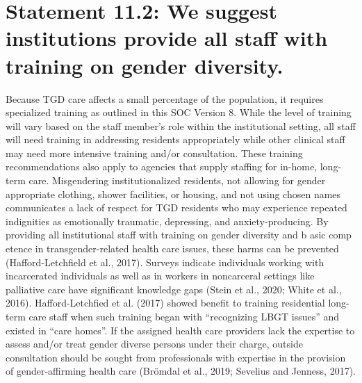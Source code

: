 \documentclass[
]{book}
\begin{document}
\hypertarget{statement-11.2-we-suggest-institutions-provide-all-staff-with-training-on-gender-diversity.}{%
\section*{Statement 11.2: We suggest institutions provide all staff with training on gender diversity.}\label{statement-11.2-we-suggest-institutions-provide-all-staff-with-training-on-gender-diversity.}}

Because TGD care affects a small percentage
of the population, it requires specialized training
as outlined in this SOC Version 8. While the
level of training will vary based on the staff
member's role within the institutional setting, all
staff will need training in addressing residents
appropriately while other clinical staff may need
more intensive training and/or consultation.
These training recommendations also apply to
agencies that supply staffing for in-home,
long-term care. Misgendering institutionalized
residents, not allowing for gender appropriate
clothing, shower facilities, or housing, and not
using chosen names communicates a lack of
respect for TGD residents who may experience
repeated indignities as emotionally traumatic,
depressing, and anxiety-producing. By providing
all institutional staff with training on gender
diversity and b asic comp etence in
transgender-related health care issues, these
harms can be prevented (Hafford-Letchfield
et al., 2017). Surveys indicate individuals working
with incarcerated individuals as well as in workers in noncarceral settings like palliative care
have significant knowledge gaps (Stein et al.,
2020; White et al., 2016). Hafford-Letchfied et al.
(2017) showed benefit to training residential
long-term care staff when such training began
with ``recognizing LBGT issues'' and existed in
``care homes''. If the assigned health care providers lack the expertise to assess and/or treat gender diverse persons under their charge, outside
consultation should be sought from professionals
with expertise in the provision of gender-affirming
health care (Brömdal et al., 2019; Sevelius and
Jenness, 2017).
\end{document}
